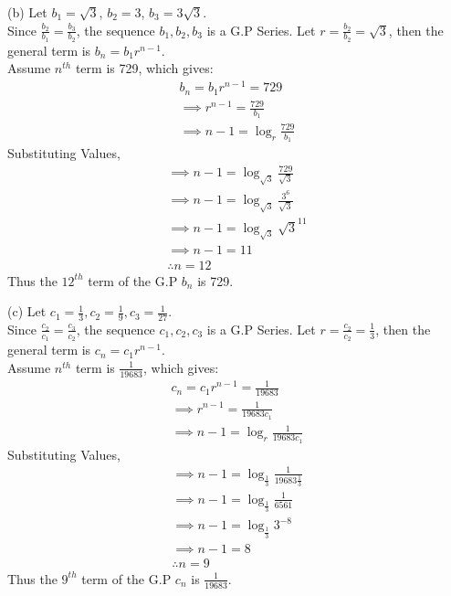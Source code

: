 \documentclass[journal,12pt,twocolumn]{IEEEtran}
\theoremstyle{remark}
\begin{document}
(b) Let $b_1 = \sqrt{3}$, $b_2 = 3$, $b_3 = 3\sqrt{3}$.\\
Since $\frac{b_2}{b_1} = \frac{b_3}{b_2}$, the sequence $b_1, b_2, b_3$ is a G.P Series.
Let $r = \frac{b_2}{b_2} = \sqrt{3}$, then the general term is $b_n = b_1 r^{n-1}$.\\
Assume $n^{th}$ term is 729, which gives: 
\begin{gather*}
    b_n = b_1 r^{n-1} = 729\\
    \implies r^{n-1} = \frac{729}{b_1}\\
    \implies n - 1 = \log_{r}{\frac{729}{b_1}}
\end{gather*}
Substituting Values,
\begin{gather*}
    \implies n - 1 = \log_{\sqrt{3}}{\frac{729}{\sqrt{3}}}\\
    \implies n - 1 = \log_{\sqrt{3}}{\frac{3^6}{\sqrt{3}}}\\
    \implies n - 1 = \log_{\sqrt{3}}{\sqrt{3}^{11}}\\
    \implies n - 1 = 11\\
    \therefore n = 12
\end{gather*}
Thus the $12^{th}$ term of the G.P $b_n$ is 729.

(c) Let $c_1 = \frac{1}{3}, c_2 = \frac{1}{9}, c_3 = \frac{1}{27}$.\\
Since $\frac{c_2}{c_1} = \frac{c_3}{c_2}$, the sequence $c_1, c_2, c_3$ is a G.P Series.
Let $r = \frac{c_2}{c_2} = \frac{1}{3}$, then the general term is $c_n = c_1 r^{n-1}$.\\
Assume $n^{th}$ term is $\frac{1}{19683}$, which gives: 
\begin{gather*}
    c_n = c_1 r^{n-1} = \frac{1}{19683}\\
    \implies r^{n-1} = \frac{1}{19683 c_1}\\
    \implies n - 1 = \log_{r}{\frac{1}{19683 c_1}}
\end{gather*}
Substituting Values,
\begin{gather*}
    \implies n - 1 = \log_{\frac{1}{3}}{\frac{1}{19683 \frac{1}{3}}}\\
    \implies n - 1 = \log_{\frac{1}{3}}{\frac{1}{6561}}\\
    \implies n - 1 = \log_{\frac{1}{3}}{3^{-8}}\\
    \implies n - 1 = 8\\
    \therefore n = 9
\end{gather*}
Thus the $9^{th}$ term of the G.P $c_n$ is $\frac{1}{19683}$.
\end{document}
